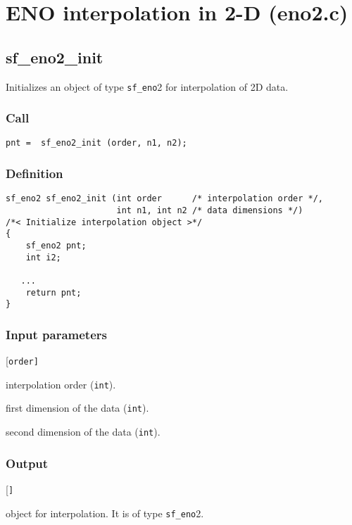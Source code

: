 \section{ENO interpolation in 2-D (eno2.c)}\label{sec:eno2.c}




\subsection{{sf\_eno2\_init}}\label{sec:sf_eno2_init}
Initializes an object of type \texttt{sf\_eno}2 for interpolation of 2D data.

\subsubsection*{Call}
\begin{verbatim}pnt =  sf_eno2_init (order, n1, n2);\end{verbatim}

\subsubsection*{Definition}
\begin{verbatim}
sf_eno2 sf_eno2_init (int order      /* interpolation order */, 
                      int n1, int n2 /* data dimensions */)
/*< Initialize interpolation object >*/
{
    sf_eno2 pnt;
    int i2;
    
   ...
    return pnt;
}
\end{verbatim}

\subsubsection*{Input parameters}
\begin{desclist}{\tt }{\quad}[\tt order]
   \setlength\itemsep{0pt}
   \item[order] interpolation order (\texttt{int}).  
   \item[n1]    first dimension of the data (\texttt{int}).  
   \item[n2]    second dimension of the data (\texttt{int}).  
\end{desclist}

\subsubsection*{Output}
\begin{desclist}{\tt }{\quad}[\tt ]
   \setlength\itemsep{0pt}  
   \item[pnt] object for interpolation. It is of type \texttt{sf\_eno}2.
\end{desclist}





